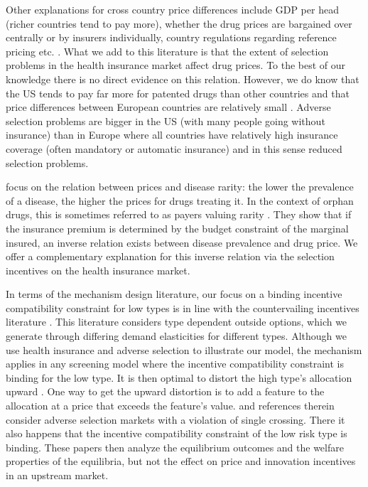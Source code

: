\documentclass[a4paper,12pt]{article}
\begin{document}
Other explanations for cross country price differences include GDP per head (richer countries tend to pay more), whether the drug prices are bargained over centrally or by insurers individually, country regulations regarding reference pricing etc. \citep{Danzon2010}. What we add to this literature is that the extent of selection problems in the health insurance market affect drug prices. To the best of our knowledge there is no direct evidence on this relation. However, we do know that the US tends to pay far more for patented drugs than other countries and that price differences between European countries are relatively small \citep{RR-2956-ASPEC,Young2017}. Adverse selection problems are bigger in the US (with many people going without insurance) than in Europe where all countries have relatively high insurance coverage (often mandatory or automatic insurance) and in this sense reduced selection problems.


\cite{Kamphorst2021} focus on the relation between prices and disease rarity: the lower the prevalence of a disease, the higher the prices for drugs treating it. In the context of orphan drugs, this is sometimes referred to as payers valuing rarity \citep{Medic2017,Messoric4615}. They show that if the insurance premium is determined by the budget constraint of the marginal insured, an inverse relation exists between disease prevalence and drug price. We offer a complementary explanation for this inverse relation via the selection incentives on the health insurance market.

In terms of the mechanism design literature, our focus on a binding incentive compatibility constraint for low types is in line with the countervailing incentives literature \citep{LEWIS1989294}. This literature considers type dependent outside options, which we generate through differing demand elasticities for different types. Although we use health insurance and adverse selection to illustrate our model, the mechanism applies in any screening model where the incentive compatibility constraint is binding for the low type. It is then optimal to distort the high type's allocation upward \citep{laf02}. One way to get the upward distortion is to add a feature to the allocation at a price that exceeds the feature's value. \cite{BooneS13} and references therein consider adverse selection markets with a violation of single crossing. There it also happens that the incentive compatibility constraint of the low risk type is binding. These papers then analyze the equilibrium outcomes and the welfare properties of the equilibria, but not the effect on price and innovation incentives in an upstream market.
\end{document}
